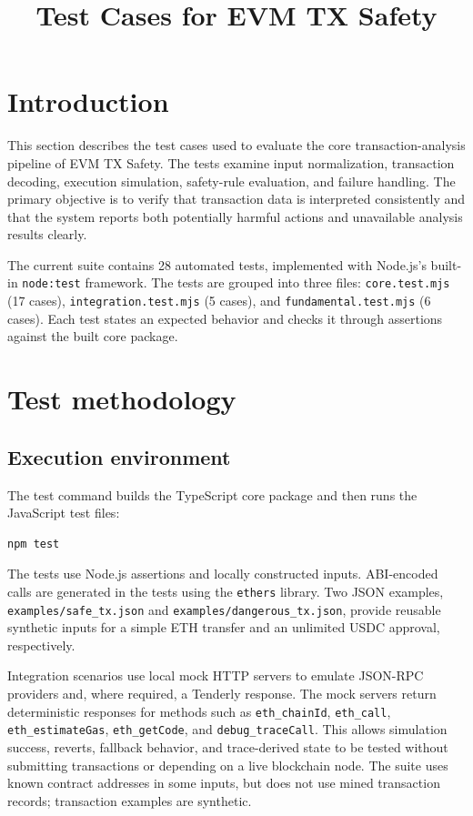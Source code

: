 \documentclass[10pt,a4paper]{article}
\title{\textbf{Test Cases for EVM TX Safety}}
\author{}
\date{}
\begin{document}
\maketitle

\section{Introduction}

This section describes the test cases used to evaluate the core transaction-analysis pipeline of EVM TX Safety. The tests examine input normalization, transaction decoding, execution simulation, safety-rule evaluation, and failure handling. The primary objective is to verify that transaction data is interpreted consistently and that the system reports both potentially harmful actions and unavailable analysis results clearly.

The current suite contains 28 automated tests, implemented with Node.js's built-in \texttt{node:test} framework. The tests are grouped into three files: \texttt{core.test.mjs} (17 cases), \texttt{integration.test.mjs} (5 cases), and \texttt{fundamental.test.mjs} (6 cases). Each test states an expected behavior and checks it through assertions against the built core package.

\section{Test methodology}

\subsection{Execution environment}

The test command builds the TypeScript core package and then runs the JavaScript test files:

\begin{verbatim}
npm test
\end{verbatim}

The tests use Node.js assertions and locally constructed inputs. ABI-encoded calls are generated in the tests using the \texttt{ethers} library. Two JSON examples, \texttt{examples/safe\_tx.json} and \texttt{examples/dangerous\_tx.json}, provide reusable synthetic inputs for a simple ETH transfer and an unlimited USDC approval, respectively.

Integration scenarios use local mock HTTP servers to emulate JSON-RPC providers and, where required, a Tenderly response. The mock servers return deterministic responses for methods such as \texttt{eth\_chainId}, \texttt{eth\_call}, \texttt{eth\_estimateGas}, \texttt{eth\_getCode}, and \texttt{debug\_traceCall}. This allows simulation success, reverts, fallback behavior, and trace-derived state to be tested without submitting transactions or depending on a live blockchain node. The suite uses known contract addresses in some inputs, but does not use mined transaction records; transaction examples are synthetic.
\end{document}
